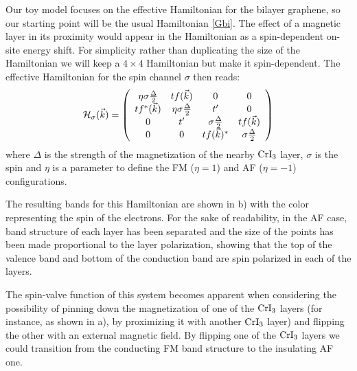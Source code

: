 Our toy model focuses on the effective Hamiltonian for the bilayer graphene, so our starting point will be the usual Hamiltonian \eqref{Gbi}. The effect of a magnetic layer in its proximity would appear in the Hamiltonian as a spin-dependent on-site energy shift.
For simplicity rather than duplicating the size of the Hamiltonian we will keep a $4\times4$ Hamiltonian but make it spin-dependent. The effective Hamiltonian for the spin channel $\sigma$ then reads:
\begin{eqnarray}
{\cal H}_{\sigma}(\vec{k})=\left(
\begin{array}{cccc}
\eta\sigma \frac{\Delta}{2} & tf(\vec{k}) & 0& 0 \\
tf^*(\vec{k}) & \eta\sigma \frac{\Delta}{2} & t' & 0 \\
0 & t'  &  \sigma \frac{\Delta}{2} &  tf(\vec{k})\\
 0 & 0 &  tf(\vec{k})^* & \sigma \frac{\Delta}{2}
\end{array}
\right)
\label{hmodel}
\end{eqnarray}
where $\Delta$ is the strength of the magnetization of the nearby $\ce{CrI_3}$ layer, $\sigma$ is the spin and $\eta$ is a parameter to define the FM ($\eta=1$) and AF ($\eta=-1$) configurations.

The resulting bands for this Hamiltonian are shown in b) with the color representing the spin of the electrons. For the sake of readability, in the AF case, band structure of each layer has been separated and the size of the points has been made proportional to the layer polarization, showing that the top of the valence band and bottom of the conduction band are spin polarized in each of the layers.

The spin-valve function of this system becomes apparent when considering the possibility of pinning down the magnetization of one of the $\ce{CrI_3}$ layers (for instance, as shown in a), by proximizing it with another $\ce{CrI_3}$ layer) and flipping the other with an external magnetic field.
By flipping one of the $\ce{CrI_3}$ layers we could transition from the conducting FM band structure to the insulating AF one.

